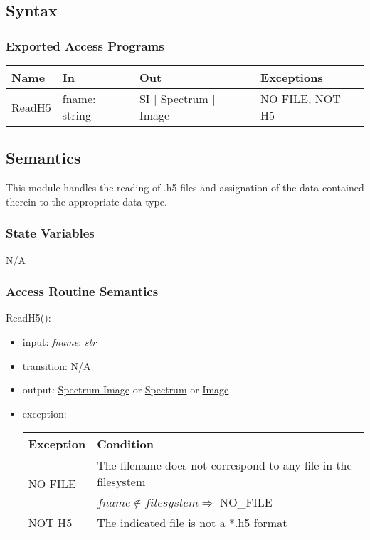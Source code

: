 \documentclass[12pt, titlepage]{article}
\begin{document}
\subsection{Syntax}

\subsubsection{Exported Access Programs}

\begin{center}
    \begin{tabular}{p{2cm} p{4cm} p{4cm} p{2cm}}
        \hline
        \textbf{Name} & \textbf{In} & \textbf{Out} & \textbf{Exceptions} \\
        \hline
        ReadH5 & fname: string & SI $|$ Spectrum $|$ Image & NO FILE, NOT H5 \\
        \hline
    \end{tabular}
\end{center}

\subsection{Semantics}
This module handles the reading of .h5 files and assignation of the data
contained therein to the appropriate data type.

\subsubsection{State Variables}
N/A

\subsubsection{Access Routine Semantics}

\noindent ReadH5():
\begin{itemize}
    \item input: \textit{fname}: \textit{str}
    \item transition: N/A
    \item output: \hyperref[Mod:SI]{Spectrum Image} or
    \hyperref[Mod:Spectrum]{Spectrum} or \hyperref[Mod:Image]{Image}
    \item exception: 
    \begin{center}
        \begin{tabular}{p{3cm} p{12cm}}
            \toprule[0.15em]
            \textbf{Exception} & \textbf{Condition}\\
            \midrule[0.1em]
            \multirow{2}{0.25\textwidth}{NO FILE} & The filename does not
            correspond to any file in the filesystem\\ 
            & $fname \notin filesystem \Rightarrow$ NO\_FILE\\ 
            \midrule[0.05em]
            NOT H5 & The indicated file is not a *.h5 format\\
            \bottomrule[0.15em]
        \end{tabular}
    \end{center}
\end{itemize}
\end{document}
